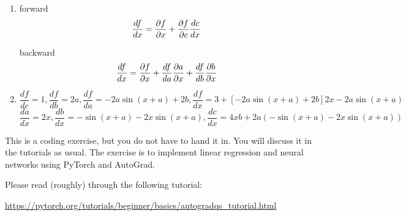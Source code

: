 \begin{solution}
\begin{enumerate}
\item forward
$$\frac{df}{dx} = \frac{\partial f}{\partial x} + \frac{\partial f}{\partial c} \frac{d c}{d x} $$

backward
$$\frac{df}{dx} = \frac{\partial f}{\partial x} + \frac{d f}{d a} \frac{\partial a}{\partial x} + \frac{d f}{d b} \frac{\partial b}{\partial x} $$

\item

$$\frac{df}{dc} = 1\comma \frac{df}{db} = 2a\comma  \frac{df}{da} = -2a \sin(x+a) + 2b \comma \frac{df}{dx} = 3 + [-2a \sin(x+a) + 2b] 2x - 2a\sin(x+a)$$
$$\frac{da}{dx} = 2x\comma \frac{db}{dx} = -\sin(x+a)-2x\sin(x+a)\comma \frac{dc}{dx} = 4xb + 2a(-\sin(x+a)-2x\sin(x+a))$$
\end{enumerate}
\end{solution}



This is a coding exercise, but you do not have to hand it in. You will discuss it in the tutorials as usual. The exercise is to implement linear regression and neural networks using PyTorch and AutoGrad.

Please read (roughly) through the following tutorial:

\url{https://pytorch.org/tutorials/beginner/basics/autogradqs_tutorial.html}


